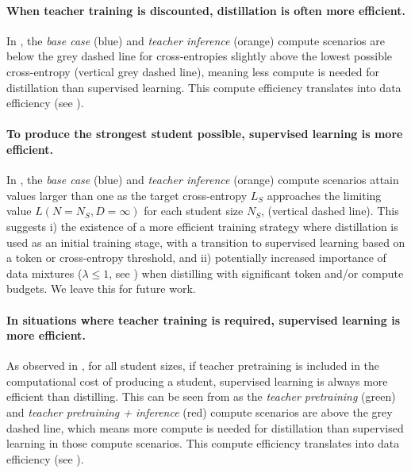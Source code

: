\paragraph{When teacher training is discounted, distillation is often more efficient.}
In
,
the \emph{base case} (blue) and 
\emph{teacher inference} (orange) compute scenarios
are below the grey dashed line for cross-entropies
slightly above the lowest possible cross-entropy (vertical grey dashed line), 
meaning less compute is needed for distillation 
than supervised learning.
This compute efficiency translates into data efficiency (see ).

\paragraph{To produce the strongest student possible, supervised learning is more efficient.}
In
,
the \emph{base case} (blue) and 
\emph{teacher inference} (orange) compute scenarios
attain values larger than one as the target cross-entropy $L_S$
approaches the limiting value $L(N=N_S,D=\infty)$ for each student size $N_S$,
(vertical dashed line).
This suggests i) the existence of a more efficient training strategy where distillation is used as an initial training stage, with a transition to supervised learning based on a token or cross-entropy threshold, and ii)
potentially increased importance of data mixtures ($\lambda\leq1$, see ) when distilling with significant token and/or compute budgets. 
We leave this for future work.

\paragraph{In situations where teacher training is required, supervised learning is more efficient.}
As observed in ,
for all student sizes, if teacher pretraining is included in the computational cost of producing a student,
supervised learning is always more efficient than distilling.
This can be seen from
as the \emph{teacher pretraining} (green) and 
\emph{teacher pretraining + inference} (red) compute scenarios
are above the grey dashed line, which means more compute is needed for distillation 
than supervised learning in those compute scenarios.
This compute efficiency translates into data efficiency (see ).


